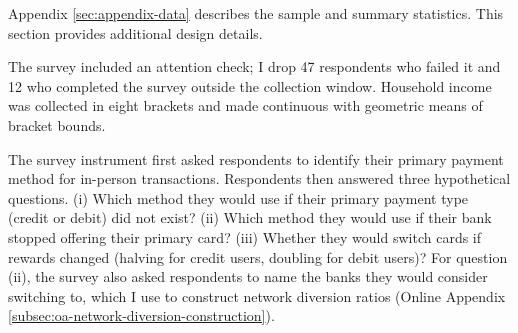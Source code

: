 \documentclass[main.tex]{subfiles}
\begin{document}
Appendix \ref{sec:appendix-data} describes the sample and summary statistics.
This section provides additional design details.

The survey included an attention check; I drop 47 respondents who failed it and 12 who completed the survey outside the collection window.
Household income was collected in eight brackets and made continuous with geometric means of bracket bounds.

The survey instrument first asked respondents to identify their primary payment method for in-person transactions.
Respondents then answered three hypothetical questions.
(i) Which method they would use if their primary payment type (credit or debit) did not exist?
(ii) Which method they would use if their bank stopped offering their primary card?
(iii) Whether they would switch cards if rewards changed (halving for credit users, doubling for debit users)?
For question (ii), the survey also asked respondents to name the banks they would consider switching to, which I use to construct network diversion ratios (Online Appendix \ref{subsec:oa-network-diversion-construction}).
\end{document}
